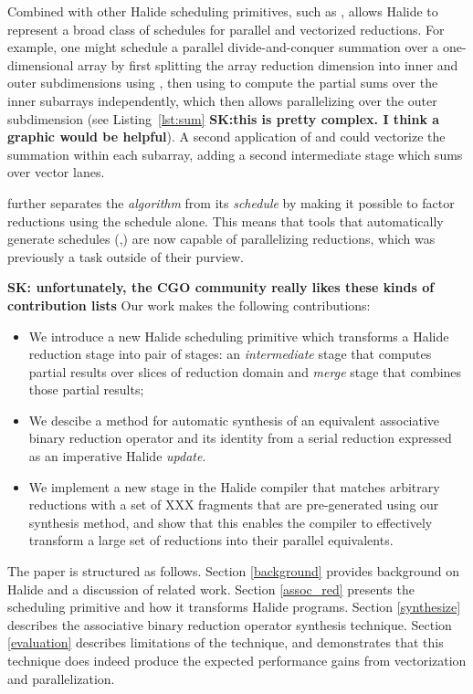 Combined with other Halide scheduling primitives, such as ,  allows Halide to represent a broad class of schedules for parallel and vectorized reductions. For example, one might schedule a parallel divide-and-conquer summation over a one-dimensional array by first splitting the array reduction dimension into inner and outer subdimensions using , then using  to compute the partial sums over the inner subarrays independently, which then allows parallelizing over the outer subdimension (see Listing~\ref{lst:sum} \textbf{SK:this is pretty complex.  I think a graphic would be helpful}). A second application of  and  could vectorize the summation within each subarray, adding a second intermediate stage which sums over vector lanes.

 further separates the \emph{algorithm} from its \emph{schedule} by making it possible to factor reductions using the schedule alone. This means that tools that automatically generate schedules (\cite{Mullapudi:2016:ASH:2897824.2925952},\cite{Ragan-Kelley:2013:HLC:2491956.2462176}) are now capable of parallelizing reductions, which was previously a task outside of their purview.

\textbf{SK: unfortunately, the CGO community really likes these kinds of contribution lists}
Our work makes the following contributions:
\begin{itemize}
  \item We introduce a new Halide scheduling primitive  which transforms a Halide reduction stage into pair of stages: an \emph{intermediate} stage that computes partial results over slices of reduction domain and \emph{merge} stage that combines those partial results;
  \item We descibe a method for automatic synthesis of an equivalent associative binary reduction operator and its identity from a serial reduction expressed as an imperative Halide \emph{update}.
  \item We implement a new stage in the Halide compiler that matches arbitrary reductions with a set of XXX fragments that are pre-generated using our synthesis method, and show that this enables the compiler to effectively transform a large set of reductions into their parallel equivalents.
\end{itemize}

The paper is structured as follows. Section \ref{background} provides background on Halide and a discussion of related work. Section \ref{assoc_red} presents the  scheduling primitive and how it transforms Halide programs. Section \ref{synthesize} describes the associative binary reduction operator synthesis technique. Section \ref{evaluation} describes limitations of the technique, and demonstrates that this technique does indeed produce the expected performance gains from vectorization and parallelization.

